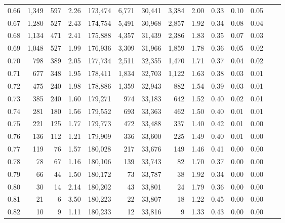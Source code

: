 \begin{tabular}{rrrrrrrrrrrrrr}
0.66 &  1,349 &    597 &    2.26 &  173,474 &    6,771 &  30,441 &   3,384 &  2.00 &  0.33 &  0.10 &      0.05 \\
0.67 &  1,280 &    527 &    2.43 &  174,754 &    5,491 &  30,968 &   2,857 &  1.92 &  0.34 &  0.08 &      0.04 \\
0.68 &  1,134 &    471 &    2.41 &  175,888 &    4,357 &  31,439 &   2,386 &  1.83 &  0.35 &  0.07 &      0.03 \\
0.69 &  1,048 &    527 &    1.99 &  176,936 &    3,309 &  31,966 &   1,859 &  1.78 &  0.36 &  0.05 &      0.02 \\
0.70 &    798 &    389 &    2.05 &  177,734 &    2,511 &  32,355 &   1,470 &  1.71 &  0.37 &  0.04 &      0.02 \\
0.71 &    677 &    348 &    1.95 &  178,411 &    1,834 &  32,703 &   1,122 &  1.63 &  0.38 &  0.03 &      0.01 \\
0.72 &    475 &    240 &    1.98 &  178,886 &    1,359 &  32,943 &     882 &  1.54 &  0.39 &  0.03 &      0.01 \\
0.73 &    385 &    240 &    1.60 &  179,271 &      974 &  33,183 &     642 &  1.52 &  0.40 &  0.02 &      0.01 \\
0.74 &    281 &    180 &    1.56 &  179,552 &      693 &  33,363 &     462 &  1.50 &  0.40 &  0.01 &      0.01 \\
0.75 &    221 &    125 &    1.77 &  179,773 &      472 &  33,488 &     337 &  1.40 &  0.42 &  0.01 &      0.00 \\
0.76 &    136 &    112 &    1.21 &  179,909 &      336 &  33,600 &     225 &  1.49 &  0.40 &  0.01 &      0.00 \\
0.77 &    119 &     76 &    1.57 &  180,028 &      217 &  33,676 &     149 &  1.46 &  0.41 &  0.00 &      0.00 \\
0.78 &     78 &     67 &    1.16 &  180,106 &      139 &  33,743 &      82 &  1.70 &  0.37 &  0.00 &      0.00 \\
0.79 &     66 &     44 &    1.50 &  180,172 &       73 &  33,787 &      38 &  1.92 &  0.34 &  0.00 &      0.00 \\
0.80 &     30 &     14 &    2.14 &  180,202 &       43 &  33,801 &      24 &  1.79 &  0.36 &  0.00 &      0.00 \\
0.81 &     21 &      6 &    3.50 &  180,223 &       22 &  33,807 &      18 &  1.22 &  0.45 &  0.00 &      0.00 \\
0.82 &     10 &      9 &    1.11 &  180,233 &       12 &  33,816 &       9 &  1.33 &  0.43 &  0.00 &      0.00 \\

\end{tabular}
